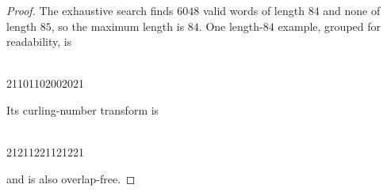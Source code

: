 \documentclass[10pt,a4paper]{amsart}
\begin{document}
\begin{proof} 
The exhaustive search finds $6048$ valid words of length $84$ and none of length $85$, so the maximum length is $84$.  One length-$84$ example, grouped for readability, is
\begin{center}
\small{}\\
21101102002021
\end{center}
Its curling-number transform is
\begin{center}
\small{}\\
21211221121221
\end{center}
and is also overlap-free.
\end{proof}
\end{document}
